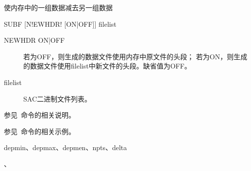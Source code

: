 \label{cmd:subf}

使内存中的一组数据减去另一组数据

\begin{SACSTX}
SUBF [N!EWHDR! [ON|OFF]] filelist
\end{SACSTX}

\begin{description}
\item [NEWHDR ON|OFF] 若为OFF，则生成的数据文件使用内存中原文件的头段；
    若为ON，则生成的数据文件使用filelist中新文件的头段。缺省值为OFF。
\item [filelist] SAC二进制文件列表。
\end{description}

参见~命令的相关说明。

参见~命令的相关示例。

depmin、depmax、depmen、npts、delta

、
